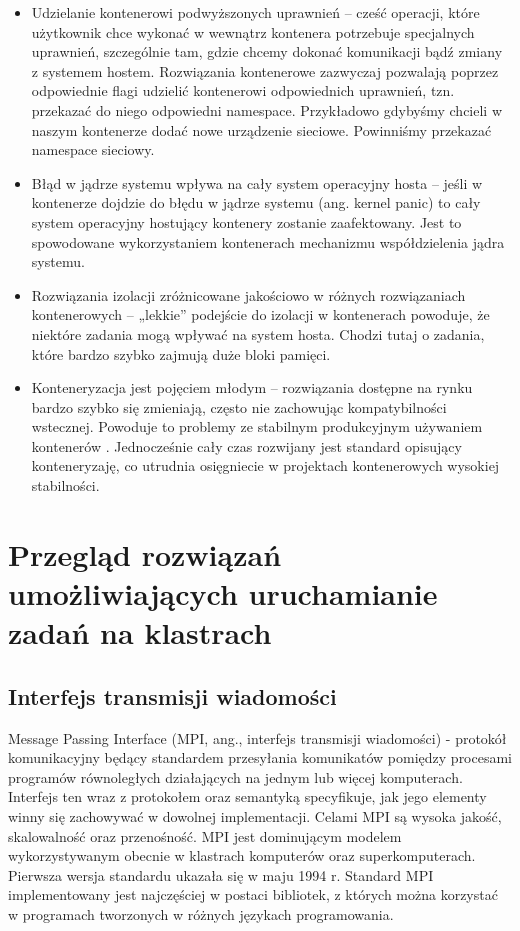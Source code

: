 \documentclass[10pt,a4paper,titlepage,twoside]{report}
\begin{document}
\begin{itemize}
	\item Udzielanie kontenerowi podwyższonych uprawnień – cześć operacji, które użytkownik chce wykonać w wewnątrz kontenera potrzebuje specjalnych uprawnień, szczególnie tam, gdzie chcemy dokonać komunikacji bądź zmiany z systemem hostem. Rozwiązania kontenerowe zazwyczaj pozwalają poprzez odpowiednie flagi udzielić kontenerowi odpowiednich uprawnień, tzn. przekazać do niego odpowiedni namespace. Przykładowo gdybyśmy chcieli w naszym kontenerze dodać nowe urządzenie sieciowe. Powinniśmy przekazać namespace sieciowy.
	\item Błąd w jądrze systemu wpływa na cały system operacyjny hosta – jeśli w kontenerze dojdzie do błędu w jądrze systemu (ang. kernel panic) to cały system operacyjny hostujący kontenery zostanie zaafektowany. Jest to spowodowane wykorzystaniem kontenerach mechanizmu współdzielenia jądra systemu.
	\item Rozwiązania izolacji zróżnicowane jakościowo w różnych rozwiązaniach kontenerowych – „lekkie” podejście do izolacji w kontenerach powoduje, że niektóre zadania mogą wpływać na system hosta. Chodzi tutaj o zadania, które bardzo szybko zajmują duże bloki pamięci.
	\item Konteneryzacja jest pojęciem młodym – rozwiązania dostępne na rynku bardzo szybko się zmieniają, często nie zachowując kompatybilności wstecznej. Powoduje to problemy ze stabilnym produkcyjnym używaniem kontenerów \cite{25}. Jednocześnie cały czas rozwijany jest standard opisujący konteneryzaję, co utrudnia osięgniecie w projektach kontenerowych wysokiej stabilności.
\end{itemize}

\newpage

\onehalfspacing
\chapter{Przegląd rozwiązań umożliwiających uruchamianie zadań na klastrach}

\section{Interfejs transmisji wiadomości}

\indent \indent Message Passing Interface (MPI, ang., interfejs transmisji wiadomości) \cite{26} - protokół komunikacyjny będący standardem przesyłania komunikatów pomiędzy procesami programów równoległych działających na jednym lub więcej komputerach. Interfejs ten wraz z protokołem oraz semantyką specyfikuje, jak jego elementy winny się zachowywać w dowolnej implementacji. Celami MPI są wysoka jakość, skalowalność oraz przenośność. MPI jest dominującym modelem wykorzystywanym obecnie w klastrach komputerów oraz superkomputerach. Pierwsza wersja standardu ukazała się w maju 1994 r. Standard MPI implementowany jest najczęściej w postaci bibliotek, z których można korzystać w programach tworzonych w różnych językach programowania.
\end{document}
